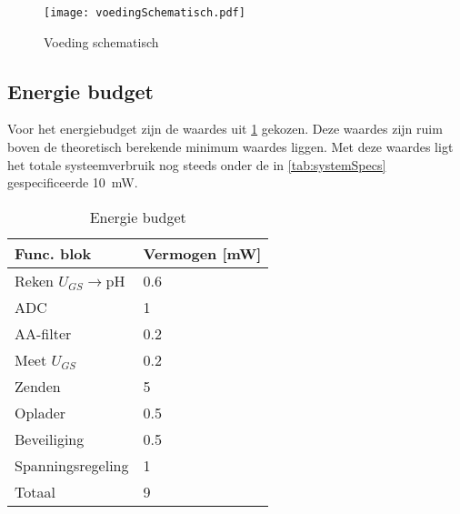 \begin{figure}[ht]
    \centering 
    \texttt{[image: voedingSchematisch.pdf]}
    \caption{Voeding schematisch}
    \label{fig:voedingSchematisch}
\end{figure}



\subsection{Energie budget}
Voor het energiebudget zijn de waardes uit \cref{tab:energieBudgetEstimatie} gekozen. Deze waardes zijn ruim boven de theoretisch berekende minimum waardes liggen. Met deze waardes ligt het totale systeemverbruik nog steeds onder de in \cref{tab:systemSpecs} gespecificeerde \qty{10}{\milli\watt}.


\begin{table}[ht]
    \centering
    \begin{tabular}{l|l}
        Func. blok          & Vermogen [mW] \\
        \hline                              
        Reken $U_{GS}\rightarrow$pH & 0.6   \\
        ADC                 & 1             \\
        AA-filter           & 0.2           \\
        Meet $U_{GS}$       & 0.2           \\
        Zenden              & 5             \\
        Oplader             & 0.5           \\
        Beveiliging         & 0.5           \\
        Spanningsregeling   & 1             \\ 
        \hline
        \hline
        Totaal              & 9
        
    \end{tabular}
    \caption{Energie budget}
    \label{tab:energieBudgetEstimatie}
\end{table}


